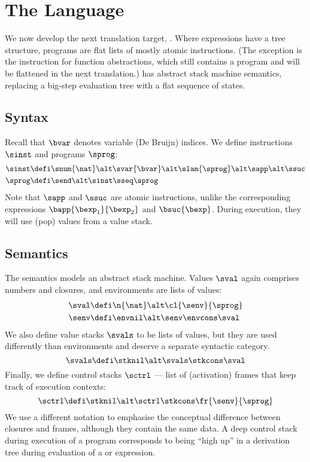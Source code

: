 \section{The \textnormal{\slang} Language}

We now develop the next translation target, \slang.
Where \blang expressions have a tree structure, \slang programs are flat lists of mostly atomic instructions.
(The exception is the instruction for function abstractions, which still contains a program and will be flattened in the next translation.)
\slang has abstract stack machine semantics, replacing a big-step evaluation tree with a flat sequence of states.


\subsection{Syntax}

Recall that $\bvar$ denotes variable (De Bruijn) indices.
We define \slang instructions $\sinst$ and programs $\sprog$:
\begin{align*}
  \sinst &\defi \snum{\nat} \alt \svar{\bvar} \alt \slam{\sprog} \alt \sapp \alt \ssuc \\
  \sprog &\defi \send \alt \sinst \sseq \sprog
\end{align*}
Note that $\sapp$ and $\ssuc$ are atomic instructions, unlike the corresponding \blang expressions $\bapp{\bexp_1}{\bexp_2}$ and $\bsuc{\bexp}$.
During execution, they will use (pop) values from a value stack.


\subsection{Semantics}

The semantics models an abstract stack machine.
Values $\sval$ again comprises numbers and closures, and environments are lists of values:
\begin{align*}
  \sval &\defi \n{\nat} \alt \cl{\senv}{\sprog} \\
  \senv &\defi \envnil \alt \senv \envcons \sval
\end{align*}
We also define value stacks $\svals$ to be lists of values, but they are used differently than environments and deserve a separate syntactic category.
\[
\svals \defi \stknil \alt \svals \stkcons \sval
\]
Finally, we define control stacks $\sctrl$ --- list of (activation) frames that keep track of execution contexts:
\[
\sctrl \defi \stknil \alt \sctrl \stkcons \fr{\senv}{\sprog}
\]
We use a different notation to emphasise the conceptual difference between closures and frames, although they contain the same data.
A deep control stack during execution of a \slang program corresponds to being ``high up'' in a derivation tree during evaluation of a \hlang or \blang expression.

